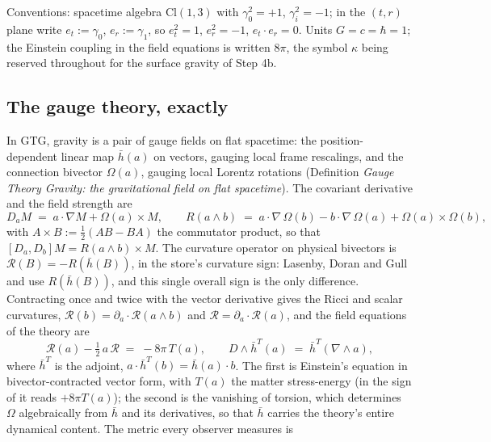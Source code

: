 \documentclass[11pt]{article}
\theoremstyle{definition}
\theoremstyle{plain}
\providecommand{\Cl}{}\renewcommand{\Cl}{\mathrm{Cl}}
\providecommand{\er}{}\renewcommand{\er}{e_r}
\providecommand{\et}{}\renewcommand{\et}{e_t}
\providecommand{\hb}{}\renewcommand{\hb}{\bar{h}}
\begin{document}
\label{c:note.singularity.setting-step-1-locate-failure}
Conventions: spacetime algebra $\Cl(1,3)$ with $\gamma_0^2 = +1$, $\gamma_i^2 = -1$; in the $(t,r)$ plane write $\et := \gamma_0$, $\er := \gamma_1$, so $\et^2 = 1$, $\er^2 = -1$, $\et \cdot \er = 0$. Units $G = c = \hbar = 1$; the Einstein coupling in the field equations is written $8\pi$, the symbol $\kappa$ being reserved throughout for the surface gravity of Step 4b.

\subsection*{The gauge theory, exactly}
\label{c:note.singularity.setting-gauge-theory-exactly}
In GTG, gravity is a pair of gauge fields on flat spacetime: the position-dependent linear map $\hb(a)$ on vectors, gauging local frame rescalings, and the connection bivector $\Omega(a)$, gauging local Lorentz rotations \cite{LDG1998} (Definition \emph{Gauge Theory Gravity: the gravitational field on flat spacetime}). The covariant derivative and the field strength are
\begin{equation}
D_a M \;=\; a\cdot\nabla M + \Omega(a) \times M, \qquad
R(a \wedge b) \;=\; a\cdot\nabla\,\Omega(b) - b\cdot\nabla\,\Omega(a) + \Omega(a) \times \Omega(b),
\end{equation}
with $A \times B := \tfrac12(AB - BA)$ the commutator product, so that $[D_a, D_b]M = R(a \wedge b) \times M$. The curvature operator on physical bivectors is $\mathcal{R}(B) = -R(\hb(B))$, in the store's curvature sign: Lasenby, Doran and Gull \cite{LDG1998} and \cite[Ch.~14]{DoranLasenby2003} use $R(\hb(B))$, and this single overall sign is the only difference. Contracting once and twice with the vector derivative gives the Ricci and scalar curvatures, $\mathcal{R}(b) = \partial_a \cdot \mathcal{R}(a \wedge b)$ and $\mathcal{R} = \partial_a \cdot \mathcal{R}(a)$, and the field equations of the theory are
\begin{equation}
\mathcal{R}(a) - \tfrac12\, a\, \mathcal{R} \;=\; -8\pi\, T(a), \qquad
D \wedge \hb^{T}(a) \;=\; \hb^{T}(\nabla \wedge a) ,
\end{equation}
where $\hb^{T}$ is the adjoint, $a \cdot \hb^{T}(b) = \hb(a) \cdot b$. The first is Einstein's equation in bivector-contracted vector form, with $T(a)$ the matter stress-energy (in the sign of \cite{LDG1998} it reads $+8\pi T(a)$); the second is the vanishing of torsion, which determines $\Omega$ algebraically from $\hb$ and its derivatives, so that $\hb$ carries the theory's entire dynamical content. The metric every observer measures is
\end{document}
